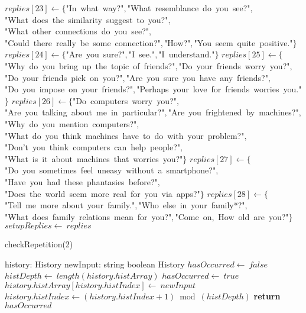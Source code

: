 \documentclass[a4paper,10pt]{article}
\begin{document}
\begin{algorithm}
\begin{algorithmic}[5]
  \State \(replies[23]\gets\{\)"{}In\ what\ way?"{}\(,\)"{}What\ resemblance\ do\ you\ see?"{}\(,\)"{}What\ does\ the\ similarity\ suggest\ to\ you?"{}\(,\)"{}What\ other\ connections\ do\ you\ see?"{}\(,\)"{}Could\ there\ really\ be\ some\ connection?"{}\(,\)"{}How?"{}\(,\)"{}You\ seem\ quite\ positive."{}\(\}\)
  \State \(replies[24]\gets\{\)"{}Are\ you\ sure?"{}\(,\)"{}I\ see."{}\(,\)"{}I\ understand."{}\(\}\)
  \State \(replies[25]\gets\{\)"{}Why\ do\ you\ bring\ up\ the\ topic\ of\ friends?"{}\(,\)"{}Do\ your\ friends\ worry\ you?"{}\(,\)"{}Do\ your\ friends\ pick\ on\ you?"{}\(,\)"{}Are\ you\ sure\ you\ have\ any\ friends?"{}\(,\)"{}Do\ you\ impose\ on\ your\ friends?"{}\(,\)"{}Perhaps\ your\ love\ for\ friends\ worries\ you."{}\(\}\)
  \State \(replies[26]\gets\{\)"{}Do\ computers\ worry\ you?"{}\(,\)"{}Are\ you\ talking\ about\ me\ in\ particular?"{}\(,\)"{}Are\ you\ frightened\ by\ machines?"{}\(,\)"{}Why\ do\ you\ mention\ computers?"{}\(,\)"{}What\ do\ you\ think\ machines\ have\ to\ do\ with\ your\ problem?"{}\(,\)"{}Don'{}t\ you\ think\ computers\ can\ help\ people?"{}\(,\)"{}What\ is\ it\ about\ machines\ that\ worries\ you?"{}\(\}\)
  \State \(replies[27]\gets\{\)"{}Do\ you\ sometimes\ feel\ uneasy\ without\ a\ smartphone?"{}\(,\)"{}Have\ you\ had\ these\ phantasies\ before?"{}\(,\)"{}Does\ the\ world\ seem\ more\ real\ for\ you\ via\ apps?"{}\(\}\)
  \State \(replies[28]\gets\{\)"{}Tell\ me\ more\ about\ your\ family."{}\(,\)"{}Who\ else\ in\ your\ family*?"{}\(,\)"{}What\ does\ family\ relations\ mean\ for\ you?"{}\(,\)"{}Come\ on,\ How\ old\ are\ you?"{}\(\}\)
  \State \(setupReplies\gets\ replies\)
\EndFunction
\end{algorithmic}
\end{algorithm}


\begin{algorithm}
\caption{checkRepetition(2)}
\begin{algorithmic}[5]
\State {}
\State {}
    \State history: History
    \State newInput: string
  \EndDecl
    \State boolean
  \EndDecl
    \State History
  \EndDecl
  \State \(hasOccurred\gets\ false\)
    \State \(histDepth\gets\ length(history.histArray)\)
        \State \(hasOccurred\gets\ true\)
      \EndIf
    \EndFor
    \State \(history.histArray[history.histIndex]\gets\ newInput\)
    \State \(history.histIndex\gets(history.histIndex+1)\bmod(histDepth)\)
  \EndIf
  \State \textbf{return} \(hasOccurred\)
\EndFunction
\end{algorithmic}
\end{algorithm}
\end{document}
